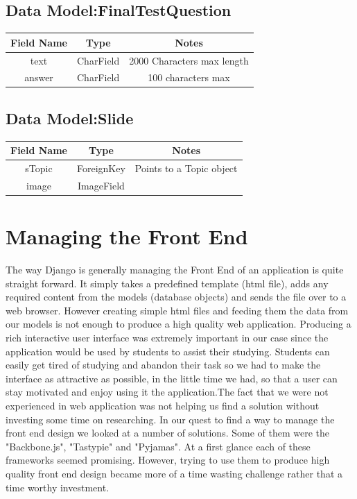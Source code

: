 \documentclass{l3proj}
\begin{document}
{\subsection{Data Model:FinalTestQuestion}
\begin{tabular}{|c|c|c|}
\hline \textbf{Field Name} & \textbf{Type} & \textbf{Notes}\\
\hline text & CharField & 2000 Characters max length \\ 
\hline answer & CharField & 100 characters max \\ \hline
\end{tabular}

\subsection{Data Model:Slide}
\begin{tabular}{|c|c|c|}
\hline \textbf{Field Name} & \textbf{Type} & \textbf{Notes}\\
\hline sTopic & ForeignKey & Points to a Topic object \\ 
\hline image & ImageField &  \\ \hline
\end{tabular}

\section{Managing the Front End}
The way Django is generally managing the Front End of an application is quite 
straight forward. It simply takes a predefined template (html file), adds any required 
content from the models (database objects) and sends the file over to a web browser. 
However creating simple html files and feeding them the data from our models is not 
enough to produce a high quality web application. Producing a rich interactive user interface was extremely important in our case since the application would be used by students to assist their studying. Students can easily get tired of studying and abandon their task so we had to make the interface as attractive as possible, in the little time we had, so that a user can stay motivated and enjoy using it the application.The fact that we were not 
experienced in web application was not helping us find a solution without investing 
some time on researching. In our quest to find a way to manage the front end design 
we looked at a number of solutions. Some of them were the "Backbone.js", "Tastypie" 
and "Pyjamas". At a first glance each of these frameworks seemed promising. 
However, trying to use them to produce high quality front end design became more of 
a time wasting challenge rather that a time worthy investment.
}
\end{document}
